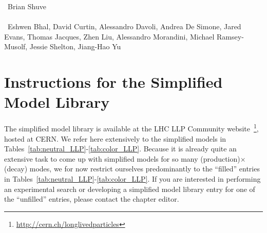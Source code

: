 ~Brian Shuve \\
\text{ \; }\\
~Eshwen Bhal, David Curtin, Alessandro Davoli, Andrea De Simone, Jared Evans, Thomas Jacques, Zhen Liu, Alessandro Morandini, Michael Ramsey-Musolf, Jessie Shelton, Jiang-Hao Yu
\text{ \; }\\

\section{Instructions for the Simplified Model Library}

The simplified model library is available at the LHC LLP Community website~\footnote{\url{http://cern.ch/longlivedparticles}}, hosted at CERN. We refer here extensively to the simplified models in Tables~\ref{tab:neutral_LLP}-\ref{tab:color_LLP}. Because it is already quite an extensive task to come up with simplified models for so many (production)$\times$(decay) modes, we for now restrict ourselves predominantly to the ``filled'' entries in Tables~\ref{tab:neutral_LLP}-\ref{tab:color_LLP}. If you are interested in performing an experimental search or developing a simplified model library entry for one of the ``unfilled'' entries, please contact the chapter editor.

